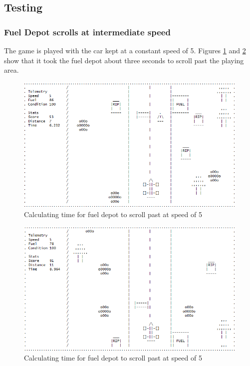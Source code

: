 \documentclass{article}
\begin{document}
\newpage
\subsection*{Testing}
\subsubsection*{Fuel Depot scrolls at intermediate speed}
The game is played with the car kept at a constant speed of 5. Figures \ref{fig:fueldepot_test_midspeed} and \ref{fig:fueldepot_test_midspeed2} show that it took the fuel depot about three seconds to scroll past the playing area.
\begin{figure}[!ht]
	\begin{center}
	\includegraphics[width=0.63\paperwidth]{images/fueldepot_test_midspeed}
	\caption{Calculating time for fuel depot to scroll past at speed of 5}
	\label{fig:fueldepot_test_midspeed} 
	\end{center}
\end{figure}
\begin{figure}[!ht]
	\begin{center}
	\includegraphics[width=0.63\paperwidth]{images/fueldepot_test_midspeed2}
	\caption{Calculating time for fuel depot to scroll past at speed of 5}
	\label{fig:fueldepot_test_midspeed2} 
	\end{center}
\end{figure}
\newpage
\end{document}
